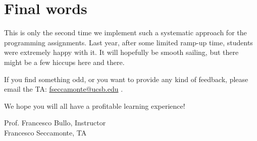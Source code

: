 \documentclass[11pt, reqno]{amsart} %
\makeatletter
\newcommand{\mymail}{fseccamonte@ucsb.edu}
\makeatother
\begin{document}

\section{Final words}

This is only the second time we implement such a systematic approach for the programming assignments.
Last year, after some limited ramp-up time, students were extremely happy with it.
It will hopefully be smooth sailing, but there might be a few hiccups here and there.

If you find something odd, or you want to provide any kind of feedback, please email the TA: \href{mailto:\mymail}{\mymail} .

\vspace{1cm}

We hope you will all have a profitable learning experience!

\vspace{0.5cm}
\begin{flushright}
Prof. Francesco Bullo, Instructor\\
Francesco Seccamonte, TA
\end{flushright}
\end{document}
